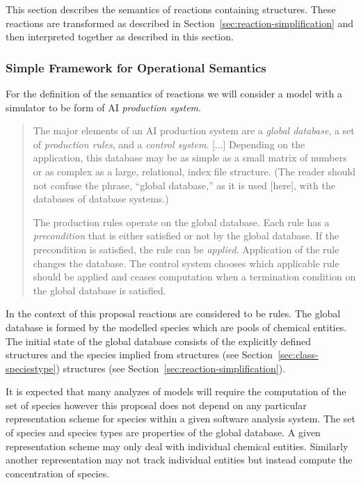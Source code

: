 \documentclass{cekarticle}
\begin{document}
This section describes the semantics of reactions containing
 structures.  These reactions are transformed
as described in Section~\ref{sec:reaction-simplification} and then
interpreted together as described in this section.

\subsubsection{Simple Framework for Operational Semantics}

For the definition of the semantics of reactions we will consider a model with a simulator to be form of
AI \emph{production system}.

\begin{quote}
The major elements of an AI production system are a \emph{global database}, a set of
\emph{production rules}, and a \emph{control system}.
[...]
Depending on the application, this database may be as simple as a small matrix of numbers or as
complex as a large, relational, index file structure.  (The reader should not confuse the phrase,
``global database,'' as it is used [here], with the databases of database systems.)

The production rules operate on the global database.  Each rule has a \emph{precondition} that is either
satisfied or not by the global database.  If the precondition is satisfied, the rule can be
\emph{applied}.  Application of the rule changes the database.  The control system chooses which
applicable rule should be applied and ceases computation when a termination condition on the global
database is satisfied.~\citep{Nilsson:1982}
\end{quote}

In the context of this proposal reactions are considered to be
rules. The global database is formed by the modelled species which
are pools of chemical entities.  The initial state of the global
database consists of the explicitly defined 
structures and the species implied from 
structures (see Section~\ref{sec:class-speciestype})
 structures (see
Section~\ref{sec:reaction-simplification}).

It is expected that many analyzes of models will require the
computation of the set of species however this proposal does not
depend on any particular representation scheme for species within
a given software analysis system.  The set of species and species
types are properties of the global database. A given
representation scheme may only deal with individual chemical
entities. Similarly another representation may not track
individual entities but instead compute the concentration of
species.
\end{document}
